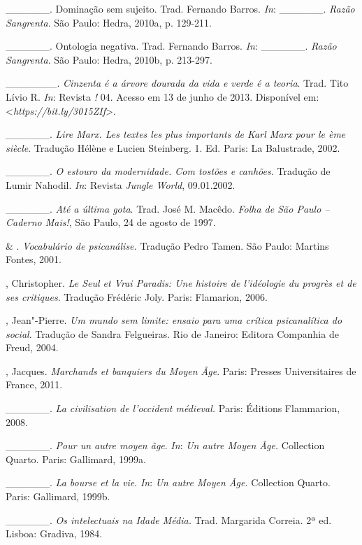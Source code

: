 \begin{Parskip}
\_\_\_\_\_\_. Dominação sem sujeito. Trad. Fernando Barros. \emph{In}:
\_\_\_\_\_\_. \emph{Razão Sangrenta}. São Paulo: Hedra, 2010a, p. 129-211.

\_\_\_\_\_\_. Ontologia negativa. Trad. Fernando Barros. \emph{In}:
\_\_\_\_\_\_. \emph{Razão Sangrenta}. São Paulo: Hedra, 2010b, p. 213-297.

\_\_\_\_\_\_\_. \emph{Cinzenta é a árvore dourada da vida e verde é a
teoria}. Trad. Tito Lívio R. \emph{In}: Revista \emph{!} 04. Acesso em 13 de
junho de 2013. Disponível em: \textless{}\emph{https://bit.ly/3015ZIf}\textgreater{}.

\_\_\_\_\_\_. \emph{Lire Marx. Les textes les plus importants de Karl
Marx pour le ème siècle}. Tradução Hélène e Lucien Steinberg.
1. Ed. Paris: La Balustrade, 2002.

\_\_\_\_\_\_. \emph{O estouro da modernidade. Com tostões e canhões.}
Tradução de Lumir Nahodil. \emph{In}: Revista \emph{Jungle World}, 09.01.2002.

\_\_\_\_\_\_. \emph{Até a última gota}. Trad. José M. Macêdo.
\emph{Folha de São Paulo -- Caderno Mais!}, São Paulo, 24 de agosto de 1997.

 \& . \emph{Vocabulário de psicanálise.} Tradução
Pedro Tamen. São Paulo: Martins Fontes, 2001.

, Christopher. \emph{Le Seul et Vrai Paradis: Une histoire de
l'idéologie du progrès et de ses critiques}. Tradução Frédéric Joly. Paris: Flamarion, 2006.

, Jean"-Pierre. \emph{Um mundo sem limite: ensaio para uma
crítica psicanalítica do social}. Tradução de Sandra Felgueiras.
Rio de Janeiro: Editora Companhia de Freud, 2004.

, Jacques. \emph{Marchands et banquiers du Moyen Âge}. Paris:
Presses Universitaires de France, 2011.

\_\_\_\_\_\_. \emph{La civilisation de l'occident médieval.} Paris:
Éditions Flammarion, 2008.

\_\_\_\_\_\_. \emph{Pour un autre moyen âge}. \emph{In}: \emph{Un autre Moyen
Âge.} Collection Quarto. Paris: Gallimard, 1999a.

\_\_\_\_\_\_. \emph{La bourse et la vie}. \emph{In}: \emph{Un autre Moyen
Âge.} Collection Quarto. Paris: Gallimard, 1999b.

\_\_\_\_\_\_. \emph{Os intelectuais na Idade Média.} Trad. Margarida Correia. 2ª ed. Lisboa: Gradiva, 1984.


\end{Parskip}
